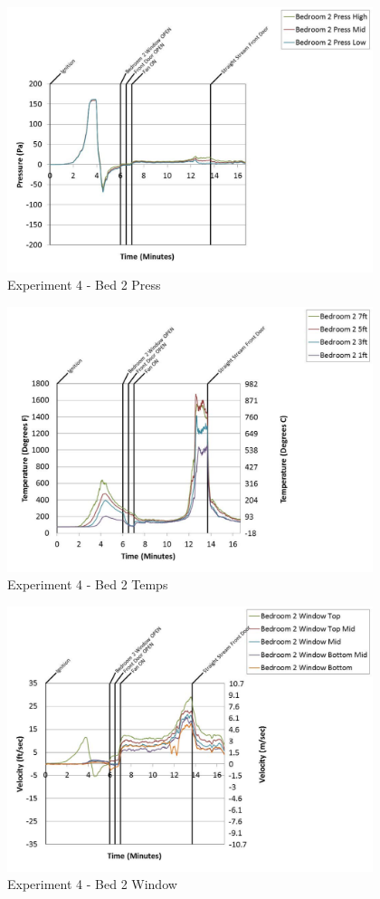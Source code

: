 \documentclass{article}
\begin{document}
\begin{appendices}
	\begin{figure}[h!]
		\centering
		\includegraphics[height=3.05in]{0_Images/Results_Charts/Exp_4_Charts/Bed2Press.pdf}
		\caption{Experiment 4 - Bed 2 Press}
	\end{figure}
 
	\clearpage

	\begin{figure}[h!]
		\centering
		\includegraphics[height=3.05in]{0_Images/Results_Charts/Exp_4_Charts/Bed2Temps.pdf}
		\caption{Experiment 4 - Bed 2 Temps}
	\end{figure}
 

	\begin{figure}[h!]
		\centering
		\includegraphics[height=3.05in]{0_Images/Results_Charts/Exp_4_Charts/Bed2Window.pdf}
		\caption{Experiment 4 - Bed 2 Window}
	\end{figure}
 

\end{appendices}
\end{document}
